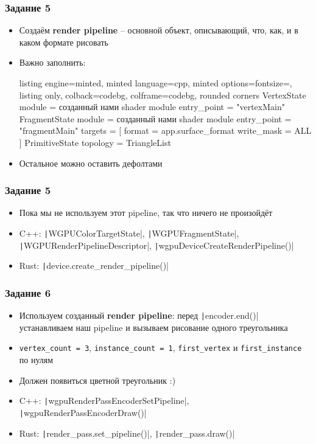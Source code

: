 \documentclass[10pt]{beamer}
\begin{document}
\begin{frame}[fragile]
\frametitle{Задание 5}
\begin{itemize}
\item Создаём \textbf{render pipeline} -- основной объект, описывающий, что, как, и в каком формате рисовать
\item Важно заполнить:
\begin{tcblisting}{listing engine=minted, minted language=cpp, minted options={fontsize=\scriptsize}, listing only, colback=codebg, colframe=codebg, rounded corners}
VertexState
    module = созданный нами shader module
    entry_point = "vertexMain"
FragmentState
    module = созданный нами shader module
    entry_point = "fragmentMain"
    targets = [{
        format = app.surface_format
        write_mask = ALL
    }]
PrimitiveState
    topology = TriangleList
\end{tcblisting}
\item Остальное можно оставить дефолтами
\end{itemize}
\end{frame}

\begin{frame}[fragile]
\frametitle{Задание 5}
\begin{itemize}
\item Пока мы не используем этот pipeline, так что ничего не произойдёт
\item C++: \texttt|WGPUColorTargetState|, \texttt|WGPUFragmentState|, \texttt|WGPURenderPipelineDescriptor|, \texttt|wgpuDeviceCreateRenderPipeline()|
\item Rust: \texttt|device.create_render_pipeline()|
\end{itemize}
\end{frame}

\begin{frame}[fragile]
\frametitle{Задание 6}
\begin{itemize}
\item Используем созданный \textbf{render pipeline}: перед \texttt|encoder.end()| устанавливаем наш pipeline и вызываем рисование одного треугольника
\item \nolinkurl{vertex_count = 3}, \nolinkurl{instance_count = 1}, \nolinkurl{first_vertex} и \nolinkurl{first_instance} по нулям
\item Должен появиться цветной треугольник :)
\item C++: \texttt|wgpuRenderPassEncoderSetPipeline|, \texttt|wgpuRenderPassEncoderDraw()|
\item Rust: \texttt|render_pass.set_pipeline()|, \texttt|render_pass.draw()|
\end{itemize}
\end{frame}
\end{document}
